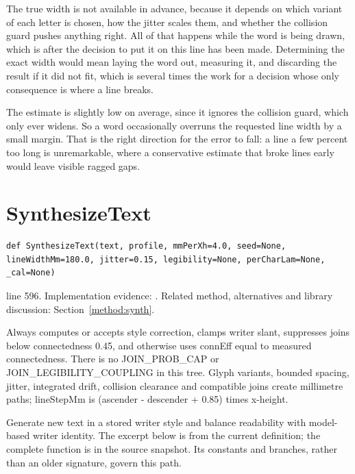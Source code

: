 The true width is not available in advance, because it depends on which variant of each letter is chosen, how the jitter scales them, and whether the collision guard pushes anything right. All of that happens while the word is being drawn, which is after the decision to put it on this line has been made. Determining the exact width would mean laying the word out, measuring it, and discarding the result if it did not fit, which is several times the work for a decision whose only consequence is where a line breaks.

The estimate is slightly low on average, since it ignores the collision guard, which only ever widens. So a word occasionally overruns the requested line width by a small margin. That is the right direction for the error to fall: a line a few percent too long is unremarkable, where a conservative estimate that broke lines early would leave visible ragged gaps.



\section{SynthesizeText}\label{fn:synthesise:SynthesizeText}
\begin{lstlisting}[style=sig]
def SynthesizeText(text, profile, mmPerXh=4.0, seed=None, lineWidthMm=180.0, jitter=0.15, legibility=None, perCharLam=None, _cal=None)
\end{lstlisting}
 line 596. Implementation evidence: \cite{code2026}. Related method, alternatives and library discussion: Section~\ref{method:synth}.


Always computes or accepts style correction, clamps writer slant, suppresses joins below connectedness 0.45, and otherwise uses connEff equal to measured connectedness. There is no JOIN\_PROB\_CAP or JOIN\_LEGIBILITY\_COUPLING in this tree. Glyph variants, bounded spacing, jitter, integrated drift, collision clearance and compatible joins create millimetre paths; lineStepMm is (ascender - descender + 0.85) times x-height.


Generate new text in a stored writer style and balance readability with model-based writer identity. The excerpt below is from the current definition; the complete function is in the source snapshot. Its constants and branches, rather than an older signature, govern this path.


